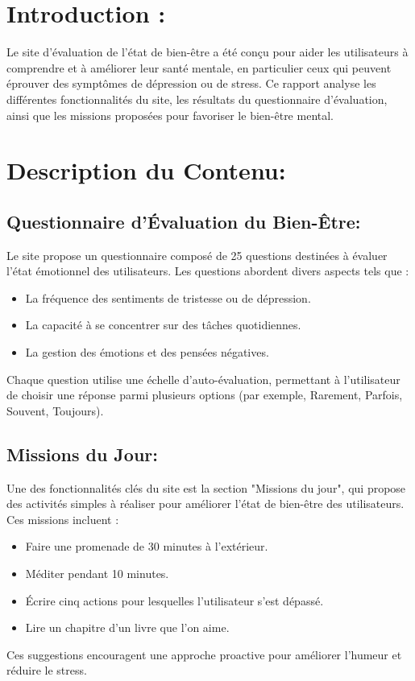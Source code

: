 \documentclass[12pt, openany]{report}
\begin{document}
\section {\color{red}Introduction :}
Le site d'évaluation de l'état de bien-être a été conçu pour aider les utilisateurs à comprendre et à améliorer leur santé mentale, en particulier ceux qui peuvent éprouver des symptômes de dépression ou de stress. Ce rapport analyse les différentes fonctionnalités du site, les résultats du questionnaire d'évaluation, ainsi que les missions proposées pour favoriser le bien-être mental.

\section {\color{red} Description du Contenu:}

\subsection{\color{red}Questionnaire d'Évaluation du Bien-Être:}

Le site propose un questionnaire composé de 25 questions destinées à évaluer l'état émotionnel des utilisateurs. Les questions abordent divers aspects tels que :

\begin{itemize}
    \item La fréquence des sentiments de tristesse ou de dépression.
    \item La capacité à se concentrer sur des tâches quotidiennes.
    \item La gestion des émotions et des pensées négatives.
\end{itemize}

Chaque question utilise une échelle d'auto-évaluation, permettant à l'utilisateur de choisir une réponse parmi plusieurs options (par exemple, Rarement, Parfois, Souvent, Toujours).



\subsection{\color{red}Missions du Jour:}
Une des fonctionnalités clés du site est la section "Missions du jour", qui propose des activités simples à réaliser pour améliorer l'état de bien-être des utilisateurs. Ces missions incluent :

\begin{itemize}
    \item Faire une promenade de 30 minutes à l'extérieur.
    \item Méditer pendant 10 minutes.
    \item Écrire cinq actions pour lesquelles l'utilisateur s'est dépassé.
    \item Lire un chapitre d'un livre que l'on aime.
\end{itemize}
Ces suggestions encouragent une approche proactive pour améliorer l'humeur et réduire le stress.
\end{document}
